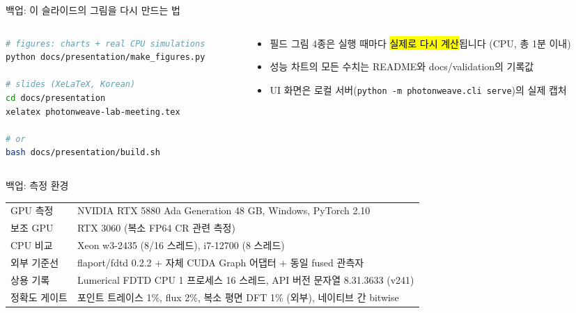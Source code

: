 \documentclass[aspectratio=169,11pt]{beamer}
\begin{document}
\begin{frame}[fragile]{백업: 이 슬라이드의 그림을 다시 만드는 법}
  \begin{columns}[T]
    \begin{column}{.56\textwidth}
\begin{lstlisting}[language=bash]
# figures: charts + real CPU simulations
python docs/presentation/make_figures.py

# slides (XeLaTeX, Korean)
cd docs/presentation
xelatex photonweave-lab-meeting.tex

# or
bash docs/presentation/build.sh
\end{lstlisting}
    \end{column}
    \begin{column}{.42\textwidth}
      \footnotesize
      \begin{itemize}
        \item 필드 그림 4종은 실행 때마다 \hl{실제로 다시 계산}됩니다 (CPU, 총 1분 이내)
        \item 성능 차트의 모든 수치는 README와 docs/validation의 기록값
        \item UI 화면은 로컬 서버(\texttt{python -m photonweave.cli serve})의 실제 캡처
      \end{itemize}
    \end{column}
  \end{columns}
\end{frame}

\begin{frame}{백업: 측정 환경}
  \begin{center}\small
    \begin{tabular}{l l}
      \toprule
      GPU 측정 & NVIDIA RTX 5880 Ada Generation 48 GB, Windows, PyTorch 2.10 \\
      보조 GPU & RTX 3060 (복소 FP64 CR 관련 측정) \\
      CPU 비교 & Xeon w3-2435 (8/16 스레드), i7-12700 (8 스레드) \\
      외부 기준선 & flaport/fdtd 0.2.2 + 자체 CUDA Graph 어댑터 + 동일 fused 관측자 \\
      상용 기록 & Lumerical FDTD CPU 1 프로세스 16 스레드, API 버전 문자열 8.31.3633 (v241) \\
      정확도 게이트 & 포인트 트레이스 1\%, flux 2\%, 복소 평면 DFT 1\% (외부), 네이티브 간 bitwise \\
      \bottomrule
    \end{tabular}
  \end{center}
  \vspace{3mm}
\end{frame}
\end{document}
